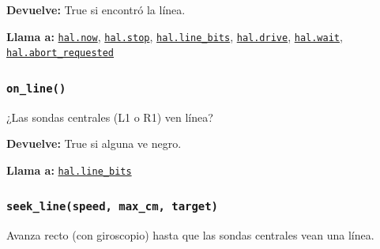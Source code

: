 \par{}\par\smallskip
\noindent\textbf{Devuelve:} True si encontró la línea.\par
\noindent\textbf{Llama a:} \hyperref[fn:hal:now]{\texttt{hal.now}}, \hyperref[fn:hal:stop]{\texttt{hal.stop}}, \hyperref[fn:hal:line-bits]{\texttt{hal.line\_\allowbreak{}bits}}, \hyperref[fn:hal:drive]{\texttt{hal.drive}}, \hyperref[fn:hal:wait]{\texttt{hal.wait}}, \hyperref[fn:hal:abort-requested]{\texttt{hal.abort\_\allowbreak{}requested}}\par

\subsubsection{\texttt{on\_\allowbreak{}line()}}\label{fn:motion:on-line}
\noindent ¿Las sondas centrales (L1 o R1) ven línea?

\noindent\textbf{Devuelve:} True si alguna ve negro.\par
\noindent\textbf{Llama a:} \hyperref[fn:hal:line-bits]{\texttt{hal.line\_\allowbreak{}bits}}\par

\subsubsection{\texttt{seek\_\allowbreak{}line(speed, max\_\allowbreak{}cm, target)}}\label{fn:motion:seek-line}
\noindent Avanza recto (con giroscopio) hasta que las sondas centrales vean una línea.


